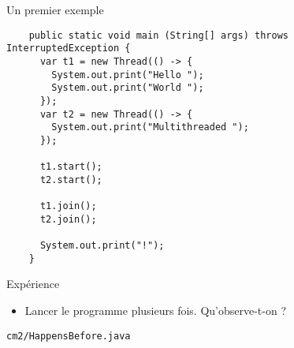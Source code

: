 
\begingroup

\begin{frame}[fragile]{Un premier exemple}

  \begin{lstlisting}
    public static void main (String[] args) throws InterruptedException {
      var t1 = new Thread(() -> {
        System.out.print("Hello ");
        System.out.print("World ");
      });
      var t2 = new Thread(() -> {
        System.out.print("Multithreaded ");
      });
      
      t1.start();
      t2.start();

      t1.join();
      t2.join();

      System.out.print("!");
    }
  \end{lstlisting}

  \begin{block}{Expérience}
    \begin{itemize}
    \item Lancer le programme plusieurs fois. Qu'observe-t-on ? 
    \end{itemize}
  \end{block}

  \begin{citing}
    \jitem \lstinline{cm2/HappensBefore.java}
  \end{citing}

\end{frame}

\endgroup
\endinput
